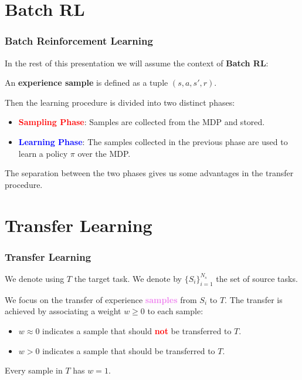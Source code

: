 \documentclass[professionalfont]{beamer}
\begin{document}
  \section{Batch RL}
	   \begin{frame}
  	 \frametitle{Batch Reinforcement Learning}
     In the rest of this presentation we will assume the context of \textbf{Batch RL}:\newline

     An \textbf{experience sample} is defined as a tuple $(s,a,s',r)$. \newline

     \pause
     Then the learning procedure is divided into two distinct phases:
     \begin{itemize}
       \item \textcolor{red}{\textbf{Sampling Phase}}: Samples are collected from the MDP and stored.
       \item \textcolor{blue}{\textbf{Learning Phase}}: The samples collected in the previous phase are
        used to learn a policy $\pi$ over the MDP.
     \end{itemize}
     The separation between the two phases gives us some advantages in the transfer procedure.
   \end{frame}


  \section{Transfer Learning}
	   \begin{frame}
  	 \frametitle{Transfer Learning}
     We denote using $T$ the target task.\newline
     We denote by $\{ S_{i} \}_{i=1}^{N_{s}}$ the set of source tasks.\newline

     We focus on the transfer of experience \textcolor{violet}{\textbf{samples}} from ${S_i}$ to $T$.\newline
     \pause
     The transfer is achieved by associating a weight $w \geq 0$ to each sample:
     \begin{itemize}
       \item $w \approx 0$ indicates a sample that should \textcolor{red}{\textbf{not}} be transferred to $T$.
       \item $w > 0$ indicates a sample that should be transferred to $T$.
     \end{itemize}
     \vspace{.7cm}
     Every sample in $T$ has $w = 1$.
  	\end{frame}
\end{document}
